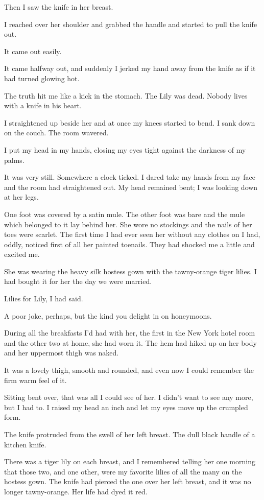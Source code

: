 \documentclass{novel}
\begin{document}
Then I saw the knife in her breast.

I reached over her shoulder and grabbed the handle and started to pull the knife out. 

It came out easily.

It came halfway out, and suddenly I jerked my hand away from the knife as if it had turned glowing hot.

The truth hit me like a kick in the stomach. The Lily was dead. Nobody lives with a knife in his heart.

I straightened up beside her and at once my knees started to bend. I sank down on the couch. The room wavered.

I put my head in my hands, closing my eyes tight against the darkness of my palms.

\scenestars

It was very still. Somewhere a clock ticked. I dared take my hands from my face and the room had straightened out. My head remained bent; I was looking down at her legs.

One foot was covered by a satin mule. The other foot was bare and the mule which belonged to it lay behind her. She wore no stockings and the nails of her toes were scarlet. The first time I had ever seen her without any clothes on I had, oddly, noticed first of all her painted toenails. They had shocked me a little and excited me.

She was wearing the heavy silk hostess gown with the tawny-orange tiger lilies. I had bought it for her the day we were married. 

Lilies for Lily, I had said. 

A poor joke, perhaps, but the kind you delight in on honeymoons.

During all the breakfasts I’d had with her, the first in the New York hotel room and the other two at home, she had worn it. The hem had hiked up on her body and her uppermost thigh was naked. 

It was a lovely thigh, smooth and rounded, and even now I could remember the firm warm feel of it.

Sitting bent over, that was all I could see of her. I didn’t want to see any more, but I had to. I raised my head an inch and let my eyes move up the crumpled form.

The knife protruded from the swell of her left breast. The dull black handle of a kitchen knife.

There was a tiger lily on each breast, and I remembered telling her one morning that those two, and one other, were my favorite lilies of all the many on the hostess gown. The knife had pierced the one over her left breast, and it was no longer tawny-orange. Her life had dyed it red.
\end{document}
